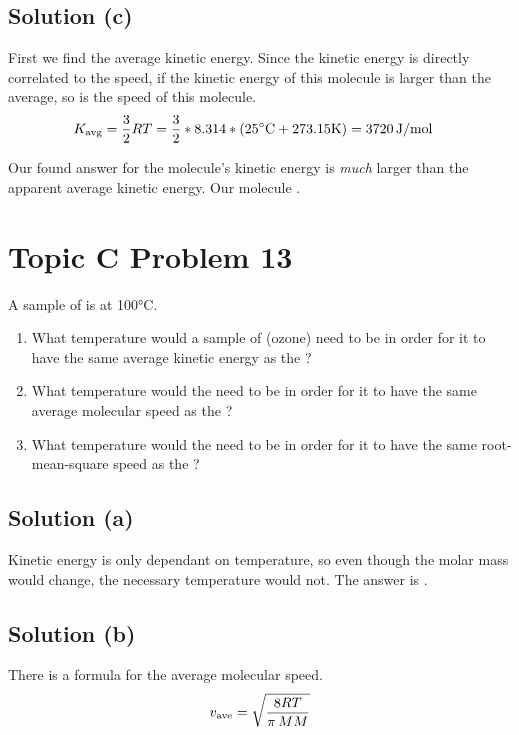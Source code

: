\documentclass[10pt]{article}
\begin{document}
        \subsection{Solution (c)}
            First we find the average kinetic energy. 
            Since the kinetic energy is directly correlated to the speed, if the kinetic energy of this molecule is larger than the average, so is the speed of this molecule.
            \begin{align}
                K_{\rm avg} &=  \frac{3}{2}RT
                    =   \frac{3}{2} * 8.314 * (25\unit{\celsius} + 273.15\unit{\kelvin})
                    =   3720\,\unit{\joule/\mole}
            \end{align}

            Our found answer for the molecule's kinetic energy is \textit{much} larger than the apparent average kinetic energy. 
            Our molecule . 

    \pagebreak
    \section{Topic C Problem 13}
        A sample of  is at 100\unit{\celsius}.
        \begin{enumerate} [label=\alph*)]
            \item What temperature would a sample of  (ozone) need to be in order for it to have the same average kinetic energy as the ?
            \item What temperature would the  need to be in order for it to have the same average molecular speed as the ?
            \item What temperature would the  need to be in order for it to have the same root-mean-square speed as the ?
        \end{enumerate}

        \subsection{Solution (a)}
            Kinetic energy is only dependant on temperature, so even though the molar mass would change, the necessary temperature would not. 
            The answer is \boxed{100\unit{\celsius}}.

        \subsection{Solution (b)}
            There is a formula for the average molecular speed. 
            \begin{gather}
                v_{\rm ave} =   \sqrt{\frac{8RT}{\pi\,MM}}
            \end{gather}
\end{document}
